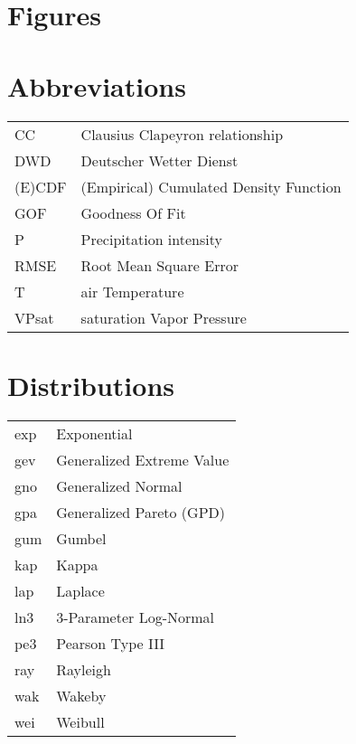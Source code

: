 \documentclass[a4paper]{article}
\begin{document}
\begin{multicols}{2}

\tableofcontents


\section*{Figures}

\makeatletter
{}%
\makeatother

\section*{Abbreviations}

\begin{tabular}{l|l}
CC     & Clausius Clapeyron relationship\\
DWD    & Deutscher Wetter Dienst\\
(E)CDF & (Empirical) Cumulated Density Function\\
GOF    & Goodness Of Fit\\
P      & Precipitation intensity\\
RMSE   & Root Mean Square Error\\
T      & air Temperature\\
VPsat  & saturation Vapor Pressure\\
\end{tabular}

\hypertarget{distnames}{}
\section*{Distributions}

\begin{tabular}{l|l}
exp	&	Exponential \\
gev	&	Generalized Extreme Value	\\
gno	&	Generalized Normal	\\
gpa	&	Generalized Pareto (GPD) \\
gum	&	Gumbel	\\
kap	&	Kappa	\\
lap	&	Laplace	\\
ln3	&	3-Parameter Log-Normal	\\
pe3	&	Pearson Type III	\\
ray	&	Rayleigh	\\
wak	&	Wakeby	\\
wei	&	Weibull	\\
\end{tabular}


\end{multicols}
\end{document}
